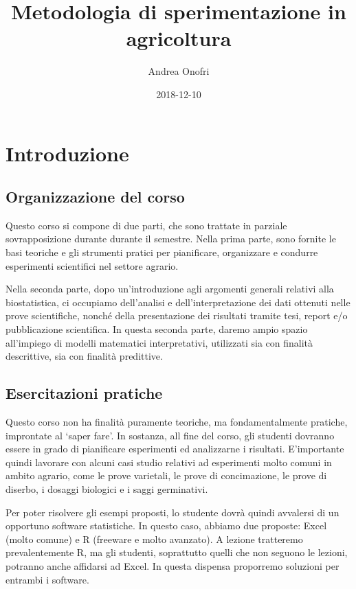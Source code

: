 \documentclass[a4paper,12pt,oneside]{book}
\author{Andrea Onofri}
\date{2018-12-10}
\title{Metodologia di sperimentazione in agricoltura}
\subtitle{}
\begin{document}
\maketitle
\tableofcontents

\chapter{Introduzione}\label{introduzione}

\section{Organizzazione del corso}\label{organizzazione-del-corso}

Questo corso si compone di due parti, che sono trattate in parziale
sovrapposizione durante durante il semestre. Nella prima parte, sono
fornite le basi teoriche e gli strumenti pratici per pianificare,
organizzare e condurre esperimenti scientifici nel settore agrario.

Nella seconda parte, dopo un'introduzione agli argomenti generali
relativi alla biostatistica, ci occupiamo dell'analisi e
dell'interpretazione dei dati ottenuti nelle prove scientifiche, nonché
della presentazione dei risultati tramite tesi, report e/o pubblicazione
scientifica. In questa seconda parte, daremo ampio spazio all'impiego di
modelli matematici interpretativi, utilizzati sia con finalità
descrittive, sia con finalità predittive.

\section{Esercitazioni pratiche}\label{esercitazioni-pratiche}

Questo corso non ha finalità puramente teoriche, ma fondamentalmente
pratiche, improntate al `saper fare'. In sostanza, all fine del corso,
gli studenti dovranno essere in grado di pianificare esperimenti ed
analizzarne i risultati. E'importante quindi lavorare con alcuni casi
studio relativi ad esperimenti molto comuni in ambito agrario, come le
prove varietali, le prove di concimazione, le prove di diserbo, i
dosaggi biologici e i saggi germinativi.

Per poter risolvere gli esempi proposti, lo studente dovrà quindi
avvalersi di un opportuno software statistiche. In questo caso, abbiamo
due proposte: Excel (molto comune) e R (freeware e molto avanzato). A
lezione tratteremo prevalentemente R, ma gli studenti, soprattutto
quelli che non seguono le lezioni, potranno anche affidarsi ad Excel. In
questa dispensa proporremo soluzioni per entrambi i software.
\end{document}
